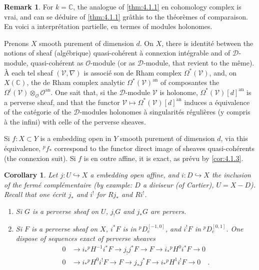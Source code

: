 \documentclass[12pt,a4paper]{article}
\theoremstyle{plain}
\newtheorem{corollary}[theorem]{Corollary}
\theoremstyle{definition}
\newtheorem{remark}[theorem]{Remark}
\newcommand{\cO}{\mathcal{O}}
\newcommand{\into}{\hookrightarrow}
\providecommand{\cO}{\mathcal{O}}
\begin{document}
\begin{remark}\label{rem:4.1.9}
For $k = \mathbb{C}$, the analogue of \ref{thm:4.1.1} en cohomology complex is vrai, and can se d\'{e}duire of \ref{thm:4.1.1} gr\^{a}this to the th\'{e}or\`{e}mes of comparaison. En voici a interpr\'{e}tation partielle, en termes of modules holonomes.

Prenons $X$ smooth purement of dimension $d$. On $X$, there is identit\'{e} between the notions of sheaf (alg\'{e}brique) quasi-coh\'{e}rent \`{a} connexion int\'{e}grable and of $\mathcal{D}$-module, quasi-coh\'{e}rent as $\cO$-module (or as $\mathcal{D}$-module, that revient to the m\^{e}me). \`{A} each tel sheaf $(\mathcal{V}, \nabla)$ is associ\'{e} son de Rham complex $\Omega^{*}(\mathcal{V})$, and, on $X(\mathbb{C})$, the de Rham complex analytic $\Omega^{*}(\mathcal{V})^{\mathrm{an}}$ of composantes the $\Omega^{i}(\mathcal{V}) \otimes_{\cO} \cO^{\mathrm{an}}$. One sait that, si the $\mathcal{D}$-module $\mathcal{V}$ is holonome, $\Omega^{*}(\mathcal{V})[d]^{\mathrm{an}}$ is a perverse sheaf, and that the functor $\mathcal{V} \mapsto \Omega^{*}(\mathcal{V})[d]^{\mathrm{an}}$ induces a \'{e}quivalence of the cat\'{e}gorie of the $\mathcal{D}$-modules holonomes \`{a} singularit\'{e}s r\'{e}guli\`{e}res (y compris \`{a} the infini) with celle of the perverse sheaves.

Si $f: X \subset Y$ is a embedding open in $Y$ smooth purement of dimension $d$, via this \'{e}quivalence, ${}^{p}f_{*}$ correspond to the functor direct image of sheaves quasi-coh\'{e}rents (the connexion suit). Si $f$ is en outre affine, it is exact, as pr\'{e}vu by \ref{cor:4.1.3}.
\end{remark}

\begin{corollary}\label{cor:4.1.10}
Let $j: U \into X$ a embedding open affine, and $i: D \into X$ the inclusion of the ferm\'{e} compl\'{e}mentaire (by example: $D$ a diviseur (of Cartier), $U = X-D$). Recall that one \'{e}crit $j_{*}$ and $i^{!}$ for $Rj_{*}$ and $Ri^{!}$.
\begin{enumerate}
\item[(i)] Si $G$ is a perverse sheaf on $U$, $j_{!}G$ and $j_{*}G$ are pervers.
\item[(ii)] Si $F$ is a perverse sheaf on $X$, $i^{*}F$ is in ${}^{p}D_{c}^{[-1,0]}$, and $i^{!}F$ in ${}^{p}D_{c}^{[0,1]}$. One dispose of sequences exact of perverse sheaves
\begin{align}
0 &\to i_{*}{}^{p}H^{-1}i^{*}F \to j_{!}j^{*}F \to F \to i_{*}{}^{p}H^{0}i^{*}F \to 0 \label{eq:4.1.10.1}\\
0 &\to i_{*}{}^{p}H^{0}i^{!}F \to F \to j_{*}j^{*}F \to i_{*}{}^{p}H^{1}i^{!}F \to 0\quad. \label{eq:4.1.10.2}
\end{align}
\end{enumerate}
\end{corollary}
\end{document}
